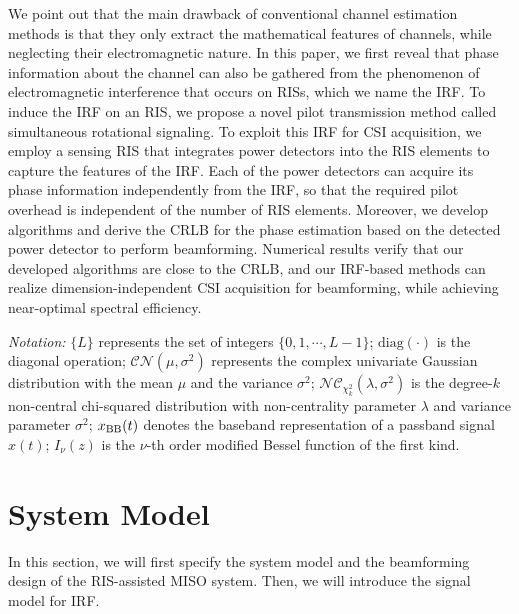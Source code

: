 \documentclass[conference,10pt,twocolumn]{IEEEtran}
\theoremstyle{nonumberplain}
\def \nc {\mathcal{NC}}
\begin{document}
We point out that the main drawback of conventional channel estimation methods is that they only extract the mathematical features of channels, while neglecting their electromagnetic nature. 
In this paper, we first reveal that phase information about the channel can also be gathered from the phenomenon of electromagnetic interference that occurs on RISs, which we name the \ac{IRF}. To induce the \ac{IRF} on an RIS, we propose a novel pilot transmission method called simultaneous rotational signaling.
To exploit this \ac{IRF} for CSI acquisition, we employ a sensing RIS that integrates power detectors into the RIS elements to capture the features of the \ac{IRF}. Each of the power detectors can acquire its phase information independently from the \ac{IRF}, so that the required pilot overhead is independent of the number of RIS elements. 
Moreover, we develop algorithms and derive the \ac{CRLB} for the phase estimation based on the detected power detector to perform beamforming.
Numerical results verify that our developed algorithms are close to the \ac{CRLB}, and our \ac{IRF}-based methods can realize dimension-independent CSI acquisition for beamforming, while achieving near-optimal spectral efficiency. 

\textit{Notation:}
$\{L\}$ represents the set of integers $\{0,1,\cdots,L-1\}$; 
$\text{diag}(\cdot )$ is the diagonal operation;
$\mathcal{CN}\left(\mu, \sigma^2 \right)$ represents the complex univariate Gaussian distribution with the mean $\mu$ and the variance $\sigma^2$;
$\nc_{\chi_k^2}(\lambda, \sigma^2)$ is the degree-$k$ non-central chi-squared distribution with non-centrality parameter $\lambda$ and variance parameter $\sigma^2$;
$x_{\rm BB}(t)$ denotes the baseband representation of a passband signal $x(t)$;
$I_\nu(z)$ is the $\nu$-th order modified Bessel function of the first kind. 


\section{System Model}  \label{System Model}
    In this section, we will first specify the system model and the beamforming design of the RIS-assisted \ac{MISO} system. 
    Then, we will introduce the signal model for IRF.
\end{document}
